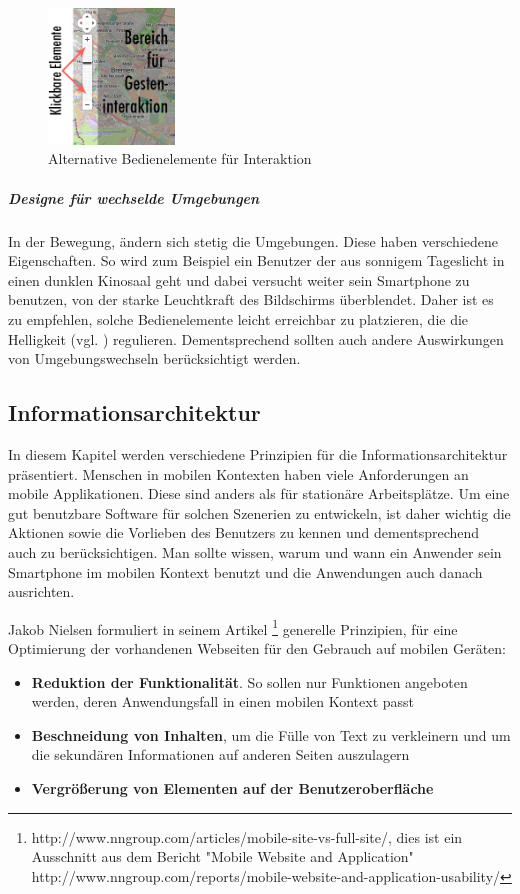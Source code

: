 \begin{figure}[h]
	\centering
	\includegraphics[width=0.3\textwidth]{img/NUIbsp.png}
	\caption{Alternative Bedienelemente für Interaktion}\label{fig:nuibsp}
\end{figure}

\subparagraph{Designe für wechselde Umgebungen} %
\label{subp:designe_f_r_au_eneinsatz}

In der Bewegung, ändern sich stetig die Umgebungen. Diese haben verschiedene Eigenschaften. So wird zum Beispiel ein Benutzer der aus sonnigem Tageslicht in einen dunklen Kinosaal geht und dabei versucht weiter sein Smartphone zu benutzen, von der starke Leuchtkraft des Bildschirms überblendet. Daher ist es zu empfehlen, solche Bedienelemente leicht erreichbar zu platzieren, die die Helligkeit (vgl. \cite[ff Seite 418]{mobileInteraces}) regulieren. Dementsprechend sollten auch andere Auswirkungen von Umgebungswechseln berücksichtigt werden.

\subsection{Informationsarchitektur}
\label{sec:Informationsaufbereitung}

In diesem Kapitel werden verschiedene Prinzipien für die Informationsarchitektur präsentiert.
Menschen in mobilen Kontexten haben viele Anforderungen an mobile Applikationen. Diese sind anders als für stationäre Arbeitsplätze. Um eine gut benutzbare Software für solchen Szenerien zu entwickeln, ist daher wichtig die Aktionen sowie die Vorlieben des Benutzers zu kennen und dementsprechend auch zu berücksichtigen. Man sollte wissen, warum und wann ein Anwender sein Smartphone im mobilen Kontext benutzt und die Anwendungen auch danach ausrichten.

Jakob Nielsen formuliert in seinem Artikel \footnote{http://www.nngroup.com/articles/mobile-site-vs-full-site/, dies ist ein  Ausschnitt aus dem Bericht "Mobile Website and Application" http://www.nngroup.com/reports/mobile-website-and-application-usability/} generelle Prinzipien, für eine Optimierung der vorhandenen Webseiten für den Gebrauch auf mobilen Geräten:
\begin{itemize}
	\item \textbf{Reduktion der Funktionalität}. So sollen nur Funktionen angeboten werden, deren Anwendungsfall in einen mobilen Kontext passt
	\item \textbf{Beschneidung von Inhalten}, um die Fülle von Text zu verkleinern und um die sekundären Informationen auf anderen Seiten auszulagern
	\item \textbf{Vergrößerung von Elementen auf der Benutzeroberfläche}
\end{itemize}

